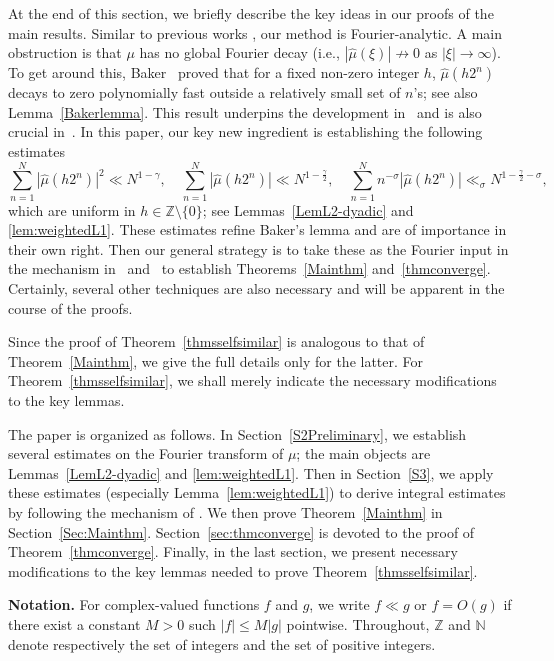 \documentclass[10pt,a4paper]{amsart}
\numberwithin{equation}{section} %
\newcommand{\N}{\mathbb{N}}
\newcommand{\Z}{\mathbb{Z}}
\begin{document}
At the end of this section, we briefly describe the  key ideas  in our proofs of the main results. 
Similar to previous works \cite{ABCY23A,ACY24,Baker25A}, our method is Fourier-analytic. A main obstruction is that $\mu$ has no global Fourier decay (i.e., $|\widehat{\mu}(\xi)|\not\to 0$ as $|\xi|\to\infty$). To get around this, Baker~\cite[Lemma 2.2]{Baker25A} proved that for a fixed non-zero integer $h$, $\widehat{\mu}(h 2^n)$ decays to zero polynomially fast outside a relatively small set of $n$'s; see also   Lemma~\ref{Bakerlemma}. This result underpins the development in~\cite{Baker25A} and is also  crucial in~\cite{ABCY23A}. In this paper, our key new ingredient  is establishing the following estimates 
$$\sum_{n=1}^{N}|\widehat{\mu}(h2^n)|^2\ll N^{1-\gamma}, \quad  \sum_{n=1}^{N}|\widehat{\mu}(h2^n)|\ll N^{1-\frac{\gamma}{2}},\quad \sum_{n=1}^{N}n^{-\sigma}|\widehat{\mu}(h2^n)|\ll_{\sigma} N^{1-\frac{\gamma}{2}-\sigma},$$
which are uniform in $h\in \Z\setminus\{0\}$; see Lemmas~\ref{LemL2-dyadic} and \ref{lem:weightedL1}. These estimates refine Baker's lemma and  are of importance in their own right. Then our general strategy is to take these as the Fourier input in  the mechanism in~\cite{Baker25A} and~\cite{ABCY23A} to establish Theorems~\ref{Mainthm} and~\ref{thmconverge}. Certainly, several other techniques are  also necessary and will be apparent in the course of the proofs. 

Since the proof of Theorem~\ref{thmsselfsimilar} is analogous to that of Theorem~\ref{Mainthm}, we give the full details only for the latter. For Theorem~\ref{thmsselfsimilar}, we shall merely indicate the necessary modifications to the key lemmas.

The paper is organized as follows. In Section~\ref{S2Preliminary}, we establish several estimates on the Fourier transform of $\mu$; the main objects are Lemmas~\ref{LemL2-dyadic} and \ref{lem:weightedL1}. Then in Section~\ref{S3}, we apply these estimates (especially Lemma~\ref{lem:weightedL1}) to derive integral estimates by following the mechanism of  \cite{Baker25A}. We then prove Theorem~\ref{Mainthm} in Section~\ref{Sec:Mainthm}. Section~\ref{sec:thmconverge} is devoted to the proof of Theorem~\ref{thmconverge}. Finally, in the last section, we present necessary modifications to the key lemmas needed to prove Theorem~\ref{thmsselfsimilar}. 


{\bf Notation.} For complex-valued functions $f$ and $g$, we write $f\ll g$ or $f=O(g)$ if there exist a constant $M>0$ such $|f|\leq M|g|$ pointwise. Throughout, $\Z$ and $\N$ denote respectively the set of  integers and the set of positive integers. 
 
\end{document}
